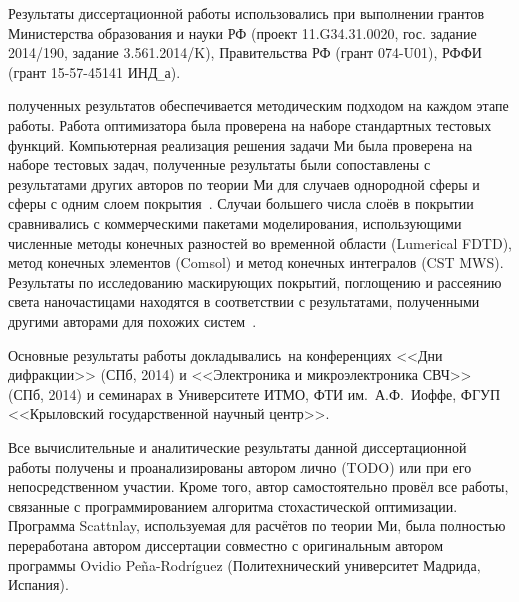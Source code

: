 Результаты диссертационной работы использовались при выполнении
грантов Министерства образования и науки РФ
(проект 11.G34.31.0020, гос. задание 2014/190, задание 3.561.2014/K),
Правительства РФ (грант 074-U01), РФФИ (грант 15-57-45141 ИНД\verb+_+а).


{\reliability} полученных результатов обеспечивается методическим
подходом на каждом этапе работы. Работа оптимизатора была проверена на
наборе стандартных тестовых функций. Компьютерная реализация решения
задачи Ми была проверена на наборе тестовых задач, полученные
результаты были сопоставлены с результатами других авторов по теории
Ми для случаев однородной сферы и сферы с одним слоем
покрытия~\cite{Suzuki-2013, Bashevoy-2005}.  Случаи большего числа
слоёв в покрытии сравнивались с коммерческими пакетами моделирования,
использующими численные методы конечных разностей во временной области
(Lumerical FDTD), метод конечных элементов (Comsol) и метод конечных
интегралов (CST MWS). Результаты по исследованию маскирующих покрытий,
поглощению и рассеянию света наночастицами находятся в соответствии с
результатами, полученными другими авторами для похожих
систем~\cite{Semouchkina-2013, Alu-2014, Fan-2011}.

{\probation}
Основные результаты работы докладывались~на конференциях <<Дни
дифракции>> (СПб, 2014) и <<Электроника и микроэлектроника СВЧ>> (СПб,
2014) и семинарах в Университете ИТМО, ФТИ им.~А.Ф.~Иоффе, ФГУП
<<Крыловский государственной научный центр>>.

{\contribution} Все вычислительные и аналитические результаты данной
диссертационной работы получены и проанализированы автором лично (TODO) или
при его непосредственном участии.  Кроме того, автор самостоятельно
провёл все работы, связанные с программированием алгоритма
стохастической оптимизации.  Программа Scattnlay, используемая для
расчётов по теории Ми, была полностью переработана автором диссертации
совместно с оригинальным автором программы Ovidio
Pe\~{n}a-Rodr\'{i}guez (Политехнический университет Мадрида, Испания).

 
